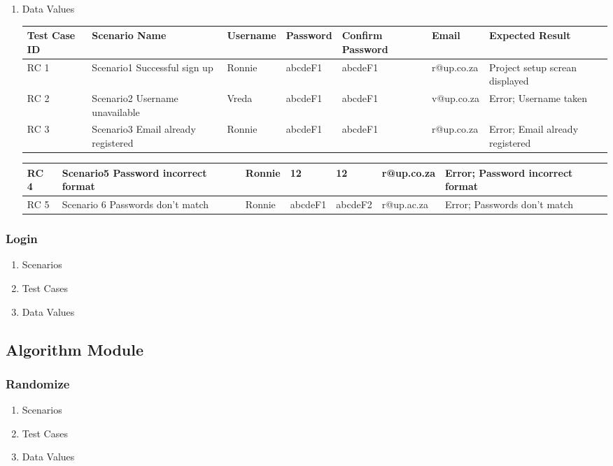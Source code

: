 \documentclass[hidelinks, 12pt, oneside]{article}
\begin{document}
\begin{enumerate}
\item Data Values

\begin{center}
\begin{tabu}to 1.1\textwidth{|X[l]|X|X|X|X|X|X|} 
 \hline
 Test Case ID & Scenario Name & Username & Password & Confirm Password & Email & Expected Result \\ [0.1ex]
 \hline
  RC 1 & Scenario1 Successful sign up & Ronnie & abcdeF1 & abcdeF1 & r@up.co.za & Project setup screan displayed\\ [0.1ex]
 \hline
 RC 2 & Scenario2 Username unavailable & Vreda&abcdeF1&abcdeF1&v@up.co.za&Error; Username taken \\[0.1ex]
 \hline
  RC 3 & Scenario3 Email already registered &Ronnie&abcdeF1&abcdeF1&r@up.co.za&Error; Email already registered\\[0.1ex]
 \hline
\end{tabu}

\begin{tabu}to 1.1\textwidth{|X[l]|X|X|X|X|X|X|} 
 \hline
 RC 4 &  Scenario5 Password incorrect format & Ronnie&12&12&r@up.co.za&Error; Password incorrect format\\[0.1ex]
 \hline
 RC 5 &  Scenario 6 Passwords don't match & Ronnie&abcdeF1&abcdeF2&r@up.ac.za&Error; Passwords don't match  \\ [0.1ex]
 \hline
\end{tabu}
\end{center}

\end{enumerate}
\subsubsection{Login}
\begin{enumerate}
\item Scenarios
\item Test Cases
\item Data Values
\end{enumerate}

\subsection{Algorithm Module}
\subsubsection{Randomize}
\begin{enumerate}
\item Scenarios
\item Test Cases
\item Data Values
\end{enumerate}
\end{document}

